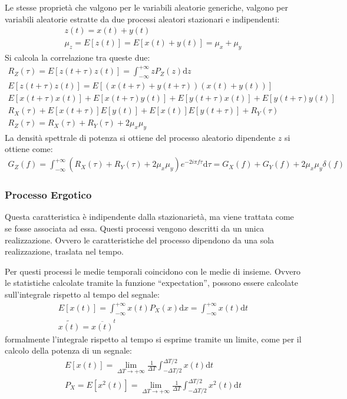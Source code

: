 \documentclass{article}
\newcommand{\df}{\mathrm{d}}
\numberwithin{equation}{subsection}
\begin{document}
Le stesse proprietà che valgono per le variabili aleatorie generiche, valgono per variabili aleatorie estratte da due processi aleatori stazionari e indipendenti:
\begin{gather*}
    z(t)=x(t)+y(t)\\
    \mu_z=E[z(t)]=E[x(t)+y(t)]=\mu_x+\mu_y
\end{gather*}
Si calcola la correlazione tra queste due:
\begin{gather*}
    R_Z(\tau)=E[z(t+\tau)z(t)]=\displaystyle\int_{-\infty}^{+\infty}zP_Z(z)\df z\\
    E[z(t+\tau)z(t)]=E[(x(t+\tau)+y(t+\tau))(x(t)+y(t))]\\
    E[x(t+\tau)x(t)]+E[x(t+\tau)y(t)]+E[y(t+\tau)x(t)]+E[y(t+\tau)y(t)]\\
    R_X(\tau)+E[x(t+\tau)]E[y(t)]+E[x(t)]E[y(t+\tau)]+R_Y(\tau)\\
    R_Z(\tau)=R_X(\tau)+R_Y(\tau)+2\mu_x\mu_y
\end{gather*}
La densità spettrale di potenza si ottiene del processo aleatorio dipendente $z$ si ottiene come:
\begin{gather*}
    G_Z(f)=\int_{-\infty}^{+\infty}\left(R_X(\tau)+R_Y(\tau)+2\mu_x\mu_y\right)e^{-2i\pi f\tau}\df \tau=G_X(f)+G_Y(f)+2\mu_x\mu_y\delta(f)
\end{gather*}

\subsubsection{Processo Ergotico}

Questa caratteristica è indipendente dalla stazionarietà, ma viene trattata come se fosse associata ad essa. 
Questi processi vengono descritti da un unica realizzazione. Ovvero le caratteristiche del processo dipendono da una sola realizzazione, traslata nel tempo. 

Per questi processi le medie temporali coincidono con le medie di insieme. Ovvero le statistiche calcolate tramite la funzione ``expectation'', possono essere 
calcolate sull'integrale rispetto al tempo del segnale:
\begin{gather*}
    E[x(t)]=\displaystyle\int_{-\infty}^{+\infty}x(t)P_X(x)\df x=\int_{-\infty}^{+\infty}x(t)\df t\\
    \widetilde{x(t)}=\overline{x(t)}^t
\end{gather*}
formalmente l'integrale rispetto al tempo si esprime tramite un limite, come per il calcolo della potenza di un segnale:
\begin{gather*}
    E[x(t)]=\lim_{\Delta T\to+\infty}\displaystyle\frac{1}{\Delta T}\int_{-\Delta T/2}^{\Delta T/2}x(t)\df t\\
    P_X=E[x^2(t)]=\lim_{\Delta T\to+\infty}\displaystyle\frac{1}{\Delta T}\int_{-\Delta T/2}^{\Delta T/2}x^2(t)\df t
\end{gather*}
\end{document}
